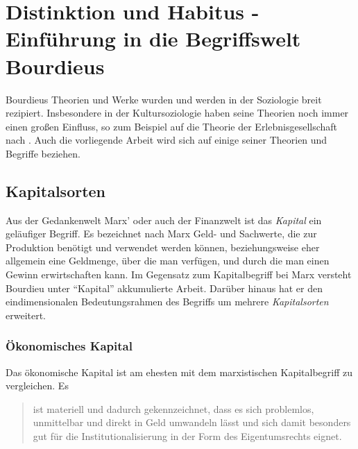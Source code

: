 \documentclass[a4paper, german, oneside]{scrbook}
\begin{document}


\chapter{Distinktion und Habitus - Einführung in die Begriffswelt Bourdieus}
Bourdieus Theorien und Werke wurden und werden in der Soziologie breit rezipiert. Insbesondere in der Kultursoziologie haben seine Theorien noch immer einen großen Einfluss, so zum Beispiel auf die Theorie der Erlebnisgesellschaft nach \cite{schulze_erlebnisgesellschaft:_1993}. Auch die vorliegende Arbeit wird sich auf einige seiner Theorien und Begriffe beziehen. \parencite[vgl.][555]{joas_sozialtheorie:_2004}

\section{Kapitalsorten}
Aus der Gedankenwelt Marx' oder auch der Finanzwelt ist das \emph{Kapital} ein geläufiger Begriff. Es bezeichnet nach Marx Geld- und Sachwerte, die zur Produktion benötigt und verwendet werden können, beziehungsweise eher allgemein eine Geldmenge, über die man verfügen, und durch die man einen Gewinn erwirtschaften kann. \parencite{Kapital} Im Gegensatz zum Kapitalbegriff bei Marx versteht Bourdieu unter \enquote{Kapital} akkumulierte Arbeit. \parencite[vgl.][86]{luthje_medium_2008} Darüber hinaus hat er den eindimensionalen Bedeutungsrahmen des Begriffs um mehrere \emph{Kapitalsorten} erweitert. 


\subsection{Ökonomisches Kapital}
Das ökonomische Kapital ist am ehesten mit dem marxistischen Kapitalbegriff zu vergleichen. Es \blockquote[{\cite[86]{luthje_medium_2008}}]{ist materiell und dadurch gekennzeichnet, dass es sich problemlos, unmittelbar und direkt in Geld umwandeln lässt und sich damit besonders gut für die Institutionalisierung in der Form des Eigentumsrechts eignet.}
\end{document}
